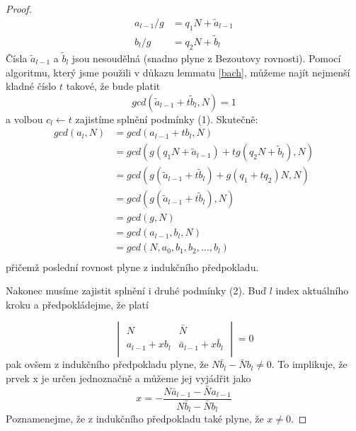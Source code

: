 \begin{proof}
\begin{equation}\label{division}
    \begin{split}
        a_{l - 1} / g & = q_1 N +  \tilde{a}_{l-1} \\
        b_{l} / g & = q_2 N +  \tilde{b}_{l}
    \end{split}
\end{equation}
Čísla $ \tilde{a}_{l-1} $ a $ \tilde{b}_{l} $ jsou nesoudělná (snadno plyne z
Bezoutovy rovnosti). Pomocí
algoritmu, který jsme použili v důkazu lemmatu \ref{bach}, můžeme najít
nejmenší kladné číslo $ t $ takové, že bude platit
\begin{equation}\label{t_search}
    gcd(\tilde{a}_{l-1} + t \tilde{b}_{l}, N) = 1
\end{equation}
a volbou $ c_l \leftarrow t $ zajistíme splnění podmínky (1). Skutečně:
\begin{align*}
    gcd(a_l, N) &= gcd(a_{l-1} + t b_l, N)  \\
                &= gcd(g (q_1 N +  \tilde{a}_{l-1})
                        + tg(q_2 N + \tilde{b}_{l}), N) \\
                &= gcd(g (\tilde{a}_{l-1} + t \tilde{b}_{l})
                        + g (q_1 + t q_2) N, N) \\
                &= gcd(g (\tilde{a}_{l-1} + t \tilde{b}_{l}), N) \\
                &= gcd(g, N) \\
                &= gcd(a_{l-1}, b_l, N) \\
                &= gcd(N, a_0, b_1, b_2, \dots, b_l) \\
\end{align*}
přičemž poslední rovnost plyne z indukčního předpokladu.

Nakonec musíme zajistit splnění i druhé podmínky (2). Buď $ l $ index aktuálního
kroku a předpokládejme, že platí

\begin{equation}\label{det}
    \begin{vmatrix}
        N & \bar{N} \\
        a_{l-1} + x b_l & \bar{a}_{l-1} + x \bar{b}_l  \\
    \end{vmatrix}
    = 0
\end{equation}
pak ovšem z indukčního předpokladu plyne, že $ N \bar{b}_l - \bar{N} b_l \neq 0 $.
To implikuje, že prvek x je určen jednoznačně a můžeme jej vyjádřit jako
\begin{equation}\label{frac}
    x = -\frac{N \bar{a}_{l-1} - \bar{N} a_{l-1}} {N \bar{b}_l - \bar{N} b_l}
\end{equation}
Poznamenejme, že z indukčního předpokladu také plyne, že $ x \neq 0 $.


\end{proof}
